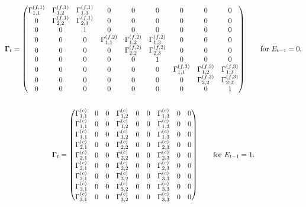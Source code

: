 \documentclass[12pt]{article}
\begin{document}
\begin{gather*}
    \boldsymbol{\Gamma}_t = 
    \begin{pmatrix}
        \Gamma_{1,1}^{(f,1)} & \Gamma_{1,2}^{(f,1)} & \Gamma_{1,3}^{(f,1)} & 0 & 0 & 0 & 0 & 0 & 0 \\
        0 & \Gamma_{2,2}^{(f,1)} & \Gamma_{2,3}^{(f,1)} & 0 & 0 & 0 & 0 & 0 & 0 \\
        0 & 0 & 1 & 0 & 0 & 0 & 0 & 0 & 0 \\
        0 & 0 & 0 & \Gamma_{1,1}^{(f,2)} & \Gamma_{1,2}^{(f,2)} & \Gamma_{1,3}^{(f,2)} & 0 & 0 & 0 \\
        0 & 0 & 0 & 0 & \Gamma_{2,2}^{(f,2)} & \Gamma_{2,3}^{(f,2)} & 0 & 0 & 0 \\
        0 & 0 & 0 & 0 & 0 & 1 & 0 & 0 & 0 \\
        0 & 0 & 0 & 0 & 0 & 0 & \Gamma_{1,1}^{(f,3)} & \Gamma_{1,2}^{(f,3)} & \Gamma_{1,3}^{(f,3)} \\
        0 & 0 & 0 & 0 & 0 & 0 & 0 & \Gamma_{2,2}^{(f,3)} & \Gamma_{2,3}^{(f,3)} \\
        0 & 0 & 0 & 0 & 0 & 0 & 0 & 0 & 1 \\
    \end{pmatrix} \qquad \text{for } E_{t-1} = 0,  \\\\
    \boldsymbol{\Gamma}_t = 
    \begin{pmatrix}
        \Gamma_{1,1}^{(c)} & 0 & 0 & \Gamma_{1,2}^{(c)} & 0 & 0 & \Gamma_{1,3}^{(c)} & 0 & 0 \\
        \Gamma_{1,1}^{(c)} & 0 & 0 & \Gamma_{1,2}^{(c)} & 0 & 0 & \Gamma_{1,3}^{(c)} & 0 & 0 \\
        \Gamma_{1,1}^{(c)} & 0 & 0 & \Gamma_{1,2}^{(c)} & 0 & 0 & \Gamma_{1,3}^{(c)} & 0 & 0 \\
        \Gamma_{2,1}^{(c)} & 0 & 0 & \Gamma_{2,2}^{(c)} & 0 & 0 & \Gamma_{2,3}^{(c)} & 0 & 0 \\
        \Gamma_{2,1}^{(c)} & 0 & 0 & \Gamma_{2,2}^{(c)} & 0 & 0 & \Gamma_{2,3}^{(c)} & 0 & 0 \\
        \Gamma_{2,1}^{(c)} & 0 & 0 & \Gamma_{2,2}^{(c)} & 0 & 0 & \Gamma_{2,3}^{(c)} & 0 & 0 \\
        \Gamma_{3,1}^{(c)} & 0 & 0 & \Gamma_{3,2}^{(c)} & 0 & 0 & \Gamma_{3,3}^{(c)} & 0 & 0 \\
        \Gamma_{3,1}^{(c)} & 0 & 0 & \Gamma_{3,2}^{(c)} & 0 & 0 & \Gamma_{3,3}^{(c)} & 0 & 0 \\
        \Gamma_{3,1}^{(c)} & 0 & 0 & \Gamma_{3,2}^{(c)} & 0 & 0 & \Gamma_{3,3}^{(c)} & 0 & 0 \\
    \end{pmatrix} \qquad \text{for } E_{t-1} = 1.  \\
\end{gather*}
\end{document}
